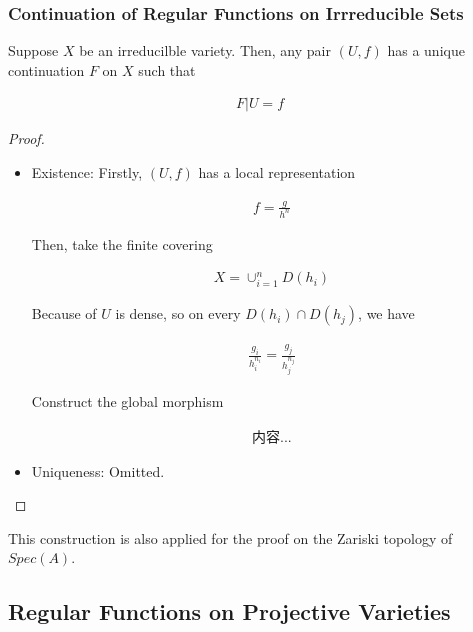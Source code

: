 \documentclass[Total.tex]{subfiles}
\begin{document}
				\subsubsection{Continuation of Regular Functions on Irrreducible Sets}
				
				\begin{proposition}
					Suppose $X$ be an irreducilble variety. Then, any pair $(U,f)$ has a unique continuation $F$ on $X$ such that
					
					\begin{gather*}
						F|U=f
					\end{gather*}
				\end{proposition}
				
				\begin{proof}
					\begin{itemize}
						\item Existence: Firstly, $(U,f)$ has a local representation 
						
						\begin{gather*}
							f=\frac{g}{h^n}
						\end{gather*}
						
						Then, take the finite covering 
						
						\begin{gather*}
							X=\cup_{i=1}^n D(h_i)
						\end{gather*}
						
						Because of $U$ is dense, so on every $D(h_i)\cap D(h_j)$, we have
						
						\begin{gather*}
							\frac{g_i}{h_i^{n_i}}=\frac{g_j}{h_j^{n_j}}
						\end{gather*} 
						
						Construct the global morphism
						
						\begin{gather*}
							内容...
						\end{gather*}
						
						\item Uniqueness: Omitted.
					\end{itemize}
				\end{proof}
				
				This construction is also applied for the proof on the Zariski topology of $Spec(A)$. 
				
			\subsection{Regular Functions on Projective Varieties}
			
\end{document}
